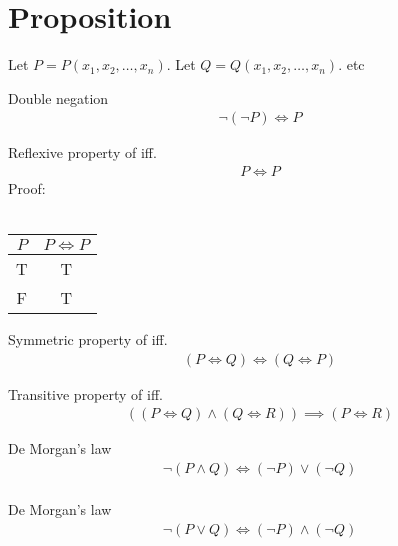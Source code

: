 \section{Proposition}
Let $P = P(x_1, x_2, \dots, x_n)$.
Let $Q = Q(x_1, x_2, \dots, x_n)$.
etc

\begin{prop}
\label{Proposition:double_negation}
Double negation
\begin{align*}
\lnot (\lnot P) \iff P
\end{align*}
\end{prop}

\begin{prop}
\label{Proposition:iff_reflexive}
Reflexive property of iff.
\begin{align*}
P \iff P
\end{align*}
Proof: \\ \\
\begin{tabular}{|c|c|}
\hline
$P$ & $P \iff P$ \\
\hline
T & T \\
\hline
F & T \\
\hline
\end{tabular}
\end{prop}

\begin{prop}
\label{Proposition:iff_symmetric}
Symmetric property of iff.
\begin{align*}
(P \iff Q) \iff (Q \iff P)
\end{align*}
\end{prop}

\begin{prop}
\label{Proposition:iff_transitive}
Transitive property of iff.
\begin{align*}
((P \iff Q) \land (Q \iff R)) \implies (P \iff R)
\end{align*}
\end{prop}

\begin{prop}
\label{Proposition:De_Morgan_1}
De Morgan's law
\begin{align*}
\lnot (P \land Q) \iff (\lnot P) \lor (\lnot Q) \\
\end{align*}
\end{prop}

\begin{prop}
\label{Proposition:De_Morgan_2}
De Morgan's law
\begin{align*}
\lnot (P \lor Q) \iff (\lnot P) \land (\lnot Q) \\
\end{align*}
\end{prop}


